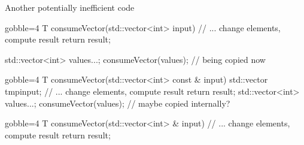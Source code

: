 \begin{frame}[fragile]
  \begin{exampleblock}{Another potentially inefficient code}
    \begin{overprint}
      \begin{cppcode*}{gobble=4}
        T consumeVector(std::vector<int> input) {
          // ... change elements, compute result
          return result;
        }

        std::vector<int> values{...};
        consumeVector(values); // being copied now
      \end{cppcode*}
      \begin{cppcode*}{gobble=4}
        T consumeVector(std::vector<int> const & input) {
          std::vector tmp{input};
          // ... change elements, compute result
          return result;
        }
        std::vector<int> values{...};
        consumeVector(values); // maybe copied internally?
      \end{cppcode*}
      \begin{cppcode*}{gobble=4}
        T consumeVector(std::vector<int> & input) {
          // ... change elements, compute result
          return result;
        }


\end{cppcode*}
\end{overprint}
\end{exampleblock}
\end{frame}
